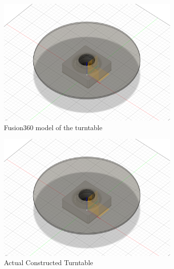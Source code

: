 \documentclass{iutbscthesis}
\begin{document}
\begin{figure}[h!]
    \centering
    \begin{subfigure}[b]{0.3\textwidth}
        \centering
        \includegraphics[width=\textwidth]{Turntable_fusion.png}
        \caption{Fusion360 model of the turntable}
        \label{fig:turntable_fusion}
    \end{subfigure}
    \hfill
    \begin{subfigure}[b]{0.3\textwidth}
        \centering
        \includegraphics[width=\textwidth]{Turntable_fusion.png}
        \caption{Actual Constructed Turntable}
        \label{fig:real turntable}
    \end{subfigure}
    \hfill
    \begin{subfigure}[b]{0.3\textwidth}
        \centering

\end{subfigure}
\end{figure}
\end{document}
